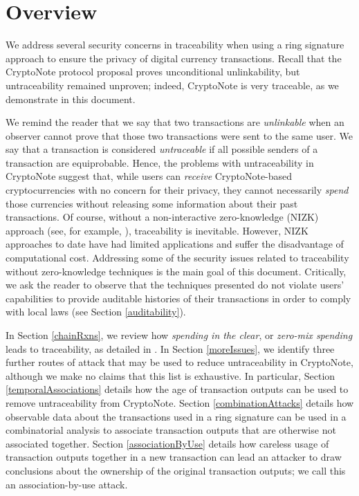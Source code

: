 \documentclass[12pt,english]{mrl}
\theoremstyle{definition}
\numberwithin{equation}{section}
\numberwithin{figure}{section}
\numberwithin{equation}{section}
\numberwithin{equation}{section}
\numberwithin{figure}{section}
\begin{document}
\section{Overview}\label{overview}

We address several security concerns in traceability when using a ring signature approach to ensure the privacy of digital currency transactions. Recall that the CryptoNote protocol proposal proves unconditional unlinkability, but untraceability remained unproven; indeed, CryptoNote is very traceable, as we demonstrate in this document. 

We remind the reader that we say that two transactions are \textit{unlinkable} when an observer cannot prove that those two transactions were sent to the same user. We say that a transaction is considered \textit{untraceable} if all possible senders of a transaction are equiprobable. Hence, the problems with untraceability in CryptoNote suggest that, while users can \textit{receive} CryptoNote-based cryptocurrencies with no concern for their privacy, they cannot necessarily \textit{spend} those currencies without releasing some information about their past transactions.  Of course, without a non-interactive zero-knowledge (NIZK) approach (see, for example, \cite{miers2013zerocoin}), traceability is inevitable. However, NIZK approaches to date have had limited applications and suffer the disadvantage of computational cost. Addressing some of the security issues related to traceability without zero-knowledge techniques is the main goal of this document. Critically, we ask the reader to observe that the techniques presented do not violate users' capabilities to provide auditable histories of their transactions in order to comply with local laws (see Section \ref{auditability}).

In Section \ref{chainRxns}, we review how \textit{spending in the clear}, or \textit{zero-mix spending} leads to traceability, as detailed in \cite{chainReactions}. In Section \ref{moreIssues}, we identify three further routes of attack that may be used to reduce untraceability in CryptoNote, although we make no claims that this list is exhaustive. In particular, Section \ref{temporalAssociations} details how the age of transaction outputs can be used to remove untraceability from CryptoNote. Section \ref{combinationAttacks} details how observable data about the transactions used in a ring signature can be used in a combinatorial analysis to associate transaction outputs that are otherwise not associated together. Section \ref{associationByUse} details how careless usage of transaction outputs together in a new transaction can lead an attacker to draw conclusions about the ownership of the original transaction outputs; we call this an association-by-use attack.
\end{document}
